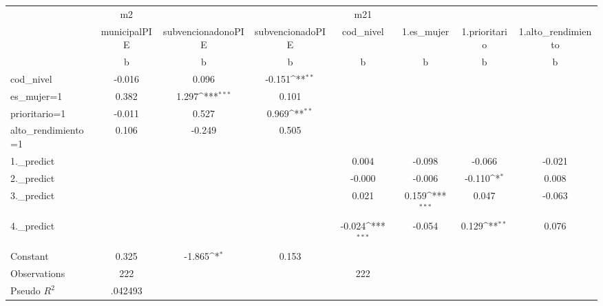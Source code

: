 {
\def\sym#1{\ifmmode^{#1}\else\(^{#1}\)\fi}
\begin{tabular}{l*{7}{c}}
\toprule
                    &          m2         &                     &                     &         m21         &                     &                     &                     \\
                    &municipalPIE         &subvencionadonoPIE         &subvencionadoPIE         &   cod\_nivel         &  1.es\_mujer         &1.prioritario         &1.alto\_rendimiento         \\
                    &           b         &           b         &           b         &           b         &           b         &           b         &           b         \\
\midrule
cod\_nivel           &      -0.016         &       0.096         &      -0.151\sym{**} &                     &                     &                     &                     \\
es\_mujer=1          &       0.382         &       1.297\sym{***}&       0.101         &                     &                     &                     &                     \\
prioritario=1       &      -0.011         &       0.527         &       0.969\sym{**} &                     &                     &                     &                     \\
alto\_rendimiento=1  &       0.106         &      -0.249         &       0.505         &                     &                     &                     &                     \\
1.\_predict          &                     &                     &                     &       0.004         &      -0.098         &      -0.066         &      -0.021         \\
2.\_predict          &                     &                     &                     &      -0.000         &      -0.006         &      -0.110\sym{*}  &       0.008         \\
3.\_predict          &                     &                     &                     &       0.021         &       0.159\sym{***}&       0.047         &      -0.063         \\
4.\_predict          &                     &                     &                     &      -0.024\sym{***}&      -0.054         &       0.129\sym{**} &       0.076         \\
Constant            &       0.325         &      -1.865\sym{*}  &       0.153         &                     &                     &                     &                     \\
\midrule
Observations        &         222         &                     &                     &         222         &                     &                     &                     \\
Pseudo \(R^{2}\)    &     .042493         &                     &                     &                     &                     &                     &                     \\
\bottomrule
\end{tabular}
}
